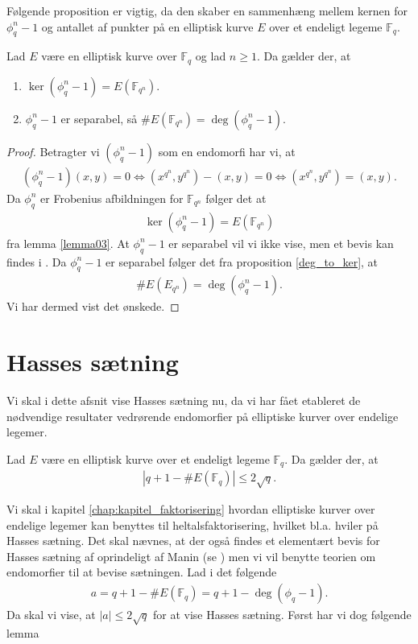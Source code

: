 Følgende proposition er vigtig, da den skaber en sammenhæng mellem kernen for $\phi_{q}^{n} - 1$ og antallet af punkter på en elliptisk kurve $E$ over et endeligt legeme $\mathbb{F}_{q}$.

\begin{proposition}
\label{prop_imp}
Lad $E$ være en elliptisk kurve over $\mathbb{F}_q$ og lad $n \geq 1$. Da gælder der,
at 
\begin{enumerate}
	\item $\ker (\phi_{q}^n - 1) = E(\mathbb{F}_{q^n})$. \label{test}
	\item $\phi_{q}^{n}-1$ er separabel, så $\#E(\mathbb{F}_{q^n})=\deg (\phi_{q}^{n}-1)$. 
\end{enumerate}
\end{proposition}
\begin{proof}
Betragter vi $(\phi_{q}^{n} - 1)$ som en endomorfi har vi, at
\begin{align*}
	(\phi_{q}^{n} - 1)(x, y) = 0 \Leftrightarrow (x^{q^n}, y^{q^n}) - (x, y) = 0 
	\Leftrightarrow (x^{q^n}, y^{q^n}) = (x, y).
\end{align*}
Da $\phi_{q}^{n}$ er Frobenius afbildningen for $\mathbb{F}_{q^n}$ følger det at 
\begin{align*}
	\ker (\phi_{q}^{n} - 1) = E(\mathbb{F}_{q^n})
\end{align*} 
fra lemma \ref{lemma03}. At $\phi_{q}^{n} -1$ er separabel vil vi ikke vise, men et bevis kan findes
i \cite[s.~58]{Washington}. Da $\phi_{q}^{n} - 1$ er separabel følger det fra proposition \ref{deg_to_ker}, at
\begin{align*}
	\#E(E_{q^n})=\deg(\phi_{q}^{n} -1).
\end{align*} 
Vi har dermed vist det ønskede.
\end{proof}

\section{Hasses sætning}
Vi skal i dette afsnit vise Hasses sætning nu, da vi har fået etableret de nødvendige resultater vedrørende endomorfier på elliptiske kurver over endelige legemer.
\begin{thm}[Hasse]
\label{hasse}
Lad $E$ være en elliptisk kurve over et endeligt legeme $\mathbb{F}_q$. Da gælder der, at 
\begin{align*}
	|q + 1 - \#E(\mathbb{F}_q)| \leq 2 \sqrt{q}.
\end{align*}
\end{thm}
Vi skal i kapitel \ref{chap:kapitel_faktorisering} hvordan elliptiske kurver over endelige legemer kan benyttes til heltalsfaktorisering, hvilket bl.a. hviler på Hasses sætning. Det skal nævnes, at der også findes et elementært bevis for Hasses sætning af oprindeligt af Manin (se \cite{Manin_proof}) men vi vil benytte teorien om endomorfier til at bevise sætningen.
Lad i det følgende 
\begin{align}
	\label{hasse_as}
	a = q + 1 - \#E(\mathbb{F}_q) = q + 1 - \deg(\phi_q - 1).
\end{align}
Da skal vi vise, at $|a| \leq 2 \sqrt{q}$ for at vise Hasses sætning. Først har vi dog følgende lemma

